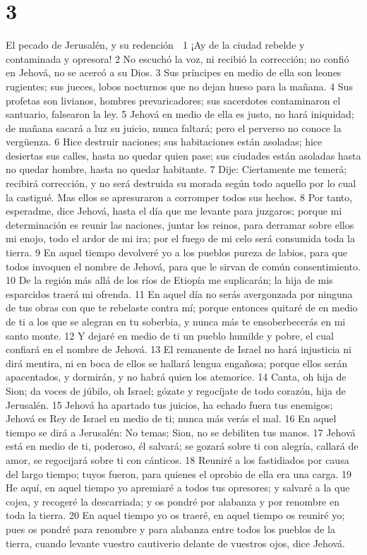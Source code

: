 \chapter{3}

El pecado de Jerusalén, y su redención

1 ¡Ay de la ciudad rebelde y contaminada y opresora!
2 No escuchó la voz, ni recibió la corrección; no confió en Jehová, no se acercó a su Dios.
3 Sus príncipes en medio de ella son leones rugientes; sus jueces, lobos nocturnos que no dejan hueso para la mañana.
4 Sus profetas son livianos, hombres prevaricadores; sus sacerdotes contaminaron el santuario, falsearon la ley.
5 Jehová en medio de ella es justo, no hará iniquidad; de mañana sacará a luz su juicio, nunca faltará; pero el perverso no conoce la vergüenza.
6 Hice destruir naciones; sus habitaciones están asoladas; hice desiertas sus calles, hasta no quedar quien pase; sus ciudades están asoladas hasta no quedar hombre, hasta no quedar habitante.
7 Dije: Ciertamente me temerá; recibirá corrección, y no será destruida su morada según todo aquello por lo cual la castigué. Mas ellos se apresuraron a corromper todos sus hechos. 
8 Por tanto, esperadme, dice Jehová, hasta el día que me levante para juzgaros; porque mi determinación es reunir las naciones, juntar los reinos, para derramar sobre ellos mi enojo, todo el ardor de mi ira; por el fuego de mi celo será consumida toda la tierra.
9 En aquel tiempo devolveré yo a los pueblos pureza de labios, para que todos invoquen el nombre de Jehová, para que le sirvan de común consentimiento.
10 De la región más allá de los ríos de Etiopía me suplicarán; la hija de mis esparcidos traerá mi ofrenda.
11 En aquel día no serás avergonzada por ninguna de tus obras con que te rebelaste contra mí; porque entonces quitaré de en medio de ti a los que se alegran en tu soberbia, y nunca más te ensoberbecerás en mi santo monte.
12 Y dejaré en medio de ti un pueblo humilde y pobre, el cual confiará en el nombre de Jehová.
13 El remanente de Israel no hará injusticia ni dirá mentira, ni en boca de ellos se hallará lengua engañosa; porque ellos serán apacentados, y dormirán, y no habrá quien los atemorice.
14 Canta, oh hija de Sion; da voces de júbilo, oh Israel; gózate y regocíjate de todo corazón, hija de Jerusalén.
15 Jehová ha apartado tus juicios, ha echado fuera tus enemigos; Jehová es Rey de Israel en medio de ti; nunca más verás el mal.
16 En aquel tiempo se dirá a Jerusalén: No temas; Sion, no se debiliten tus manos.
17 Jehová está en medio de ti, poderoso, él salvará; se gozará sobre ti con alegría, callará de amor, se regocijará sobre ti con cánticos.
18 Reuniré a los fastidiados por causa del largo tiempo; tuyos fueron, para quienes el oprobio de ella era una carga.
19 He aquí, en aquel tiempo yo apremiaré a todos tus opresores; y salvaré a la que cojea, y recogeré la descarriada; y os pondré por alabanza y por renombre en toda la tierra.
20 En aquel tiempo yo os traeré, en aquel tiempo os reuniré yo; pues os pondré para renombre y para alabanza entre todos los pueblos de la tierra, cuando levante vuestro cautiverio delante de vuestros ojos, dice Jehová.

